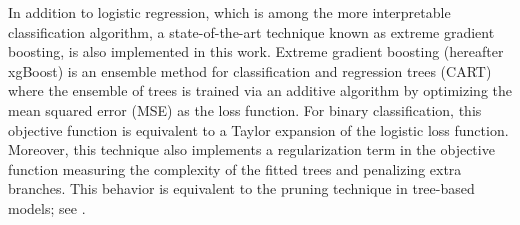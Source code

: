 \documentclass[10pt,a4paper]{article}
\begin{document}
In addition to logistic regression, which is among the more interpretable classification algorithm, a state-of-the-art technique known as extreme gradient boosting, is also implemented in this work. Extreme gradient boosting (hereafter xgBoost) is an ensemble method for classification and regression trees (CART) where the ensemble of trees is trained via an additive algorithm by optimizing the mean squared error (MSE) as the loss function. For binary classification, this objective function is equivalent to a Taylor expansion of the logistic loss function. Moreover, this technique also implements a regularization term in the objective function measuring the complexity of the fitted trees and penalizing extra branches. This behavior is equivalent to the pruning technique in tree-based models; see \cite{chen2016xgboost}. 

\end{document}
